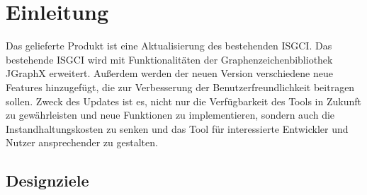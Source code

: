 \documentclass[10pt,a4paper]{article}
\begin{document}
\section{Einleitung}
Das gelieferte Produkt ist eine Aktualisierung des bestehenden ISGCI. Das bestehende ISGCI wird mit Funktionalitäten der Graphenzeichenbibliothek JGraphX erweitert. Außerdem werden der neuen Version verschiedene neue Features hinzugefügt, die zur Verbesserung der Benutzerfreundlichkeit beitragen sollen. Zweck des Updates ist es, nicht nur die Verfügbarkeit des Tools in Zukunft zu gewährleisten und neue Funktionen zu implementieren, sondern auch die Instandhaltungskosten zu senken und das Tool für interessierte Entwickler und Nutzer ansprechender zu gestalten.
\newpage
\subsection{Designziele}
\end{document}
